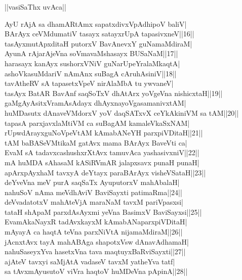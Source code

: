 \documentclass{article}
\begin{document}
\begin{center}
||vasiSaThx uvAca||
\end{center}

AyU rAjA sa dhamARtAmx sapatxdivxVpAdhipoV baliV|\\
BArAyx ceVMdumatiV tasayx satayxrUpA tapasivxneV||16||\\
tasAyxmutApxditaH putorxV BavAnevxY guNamaMdiraM|\\
AyunA rAjarAjeVna soVmavaMshasayx BUSaNaM||17||\\
harasayx kanAyx sushorxVNiV guNarUpeYralaMkaqtA|\\
ashoVkasuMdariV nAmAnx suBagA cAruhAsiniV||18||\\
tavAtheRV sA tapasetxVpeV nirAlaMbA tu ywvaneV|\\
tasAyx BatAR BavAnf saqSoTxV dhAtArx yoVgeVna nishicxtaH||19||\\
gaMgAyAsitxVramAsAdayx dhAyxnayoVgasamanivxtAM|\\
huMDasutx dAnaveVMdorxV yoV daqSATxvX ceYkAkiniVM sa tAM||20||\\
tapasA parxjavxlaMtiVM ca suBagAM kamaleVkaSxNAM|\\
rUpwdArayxguNoVpeVtAM kAmabANeYH parxpiVDitaH||21||\\
tAM baBASeVMtikaM gatAvx mama BArAyx BaveVti ca|\\
EvaM sA tadavxcashushxrXtAvx tamuvAca yashasivxniV||22||\\
mA huMDA sAhasaM kASiRVmAR jalapxsavx punaH punaH|\\
apArxpAyxhaM tavxyA deYtayx paraBArAyx visheVSataH||23||\\
deYveVna meV purA saqSaTx AyuputorxV mahAbalaH|\\
nahuSoV nAma meVdhAviV BaviSayxti patimaRma||24||\\
deVvadatotxV mahAteVjA maraNaM tavxM pariVpasxsi|\\
tataH shApaM parxdAsAyxmi yeVna BasimxV BaviSayxsi||25||\\
EvamAkaNayxR tadAvxkayxM kAmabANaparxpiVDitaH|\\
mAyayA ca haqtA teVna parxNiVtA nijamaMdiraM||26||\\
jAcnxtAvx tayA mahABAga shapotxVsw dAnavAdhamaH|\\
nahuSaseyxYva hasetxVna tava maqtuyxBaRviSayxti||27||\\
ajAteV tavxyi saMjAtA vadaseV tavxM yatheYva tatf|\\
sa tAvxmAyusutoV viVra haqtoV huMDeVna pApinA||28||\\
\end{document}
